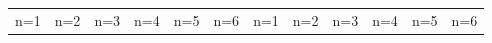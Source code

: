 \documentclass[letterpaper]{article} %
\begin{document}
\begin{figure}[!htbp]
\centering
\footnotesize
\begin{tabular}{cccccccccccc}
\multicolumn{1}{c}{n=1} \hspace{-12pt} &
\multicolumn{1}{c}{n=2} \hspace{-12pt} &
\multicolumn{1}{c}{n=3} \hspace{-12pt} &
\multicolumn{1}{c}{n=4} \hspace{-12pt} &
\multicolumn{1}{c}{n=5} \hspace{-12pt} &
\multicolumn{1}{c}{n=6} \hspace{-12pt} &
\multicolumn{1}{c}{n=1} \hspace{-12pt} &
\multicolumn{1}{c}{n=2} \hspace{-12pt} &
\multicolumn{1}{c}{n=3} \hspace{-12pt} &
\multicolumn{1}{c}{n=4} \hspace{-12pt} &
\multicolumn{1}{c}{n=5} \hspace{-12pt} &
\multicolumn{1}{c}{n=6} \\


\end{tabular}
\end{figure}
\end{document}
